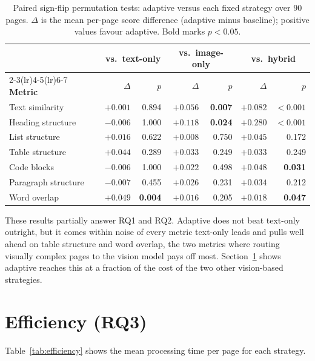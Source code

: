 \begin{table}[ht]
\centering
\caption{Paired sign-flip permutation tests: adaptive versus each fixed
strategy over 90 pages. $\Delta$ is the mean per-page score difference
(adaptive minus baseline); positive values favour adaptive. Bold marks
$p < 0.05$.}
\label{tab:significance}
\renewcommand{\arraystretch}{1.3}
\begin{tabular}{lrrrrrr}
\toprule
 & \multicolumn{2}{c}{\textbf{vs.\ text-only}} & \multicolumn{2}{c}{\textbf{vs.\ image-only}} & \multicolumn{2}{c}{\textbf{vs.\ hybrid}} \\
\cmidrule(lr){2-3}\cmidrule(lr){4-5}\cmidrule(lr){6-7}
\textbf{Metric} & $\Delta$ & $p$ & $\Delta$ & $p$ & $\Delta$ & $p$ \\
\midrule
Text similarity     & $+0.001$ & 0.894 & $+0.056$ & \textbf{0.007} & $+0.082$ & $\mathbf{<0.001}$ \\
Heading structure   & $-0.006$ & 1.000 & $+0.118$ & \textbf{0.024} & $+0.280$ & $\mathbf{<0.001}$ \\
List structure      & $+0.016$ & 0.622 & $+0.008$ & 0.750 & $+0.045$ & 0.172 \\
Table structure     & $+0.044$ & 0.289 & $+0.033$ & 0.249 & $+0.033$ & 0.249 \\
Code blocks         & $-0.006$ & 1.000 & $+0.022$ & 0.498 & $+0.048$ & \textbf{0.031} \\
Paragraph structure & $-0.007$ & 0.455 & $+0.026$ & 0.231 & $+0.034$ & 0.212 \\
Word overlap        & $+0.049$ & \textbf{0.004} & $+0.016$ & 0.205 & $+0.018$ & \textbf{0.047} \\
\bottomrule
\end{tabular}
\end{table}

These results partially answer RQ1 and RQ2. Adaptive does not beat
text-only outright, but it comes within noise of every metric text-only
leads and pulls well ahead on table structure and word overlap, the two
metrics where routing visually complex pages to the vision model pays off
most. Section~\ref{sec:efficiency}
shows adaptive reaches this at a fraction of the cost of the two other
vision-based strategies.

\section{Efficiency (RQ3)}
\label{sec:efficiency}

Table~\ref{tab:efficiency} shows the mean processing time per page for
each strategy.

